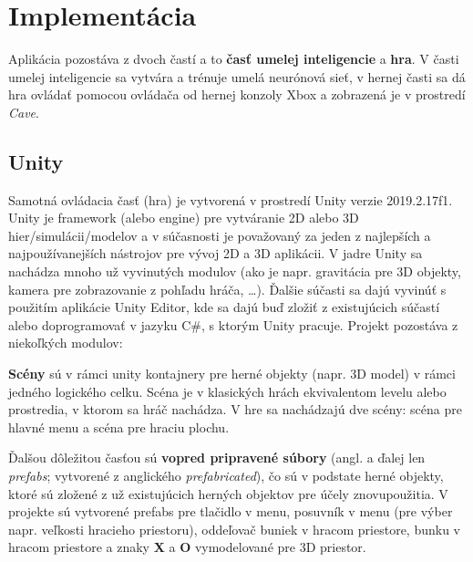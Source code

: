 \clearpage
\section{Implementácia}\label{sec:programming}

Aplikácia pozostáva z dvoch častí a to \textbf{časť umelej inteligencie} a \textbf{hra}.
V časti umelej inteligencie sa vytvára a trénuje umelá neurónová sieť, v hernej časti sa dá hra ovládať pomocou
ovládača od hernej konzoly Xbox a zobrazená je v prostredí \emph{Cave}.

\subsection{Unity}\label{subsec:unity}
Samotná ovládacia časť (hra) je vytvorená v prostredí Unity verzie 2019.2.17f1.
Unity je framework (alebo engine) pre vytváranie 2D alebo 3D hier/simulácii/modelov a v súčasnosti je považovaný za
jeden z najlepších a najpoužívanejších nástrojov pre vývoj 2D a 3D aplikácii.
V jadre Unity sa nachádza mnoho už vyvinutých modulov (ako je napr. gravitácia pre 3D objekty, kamera pre zobrazovanie
z pohľadu hráča, \dots).
Ďalšie súčasti sa dajú vyvinúť s použitím aplikácie Unity Editor, kde sa dajú buď zložiť z existujúcich súčastí
alebo doprogramovať v jazyku C\#, s ktorým Unity pracuje.
Projekt pozostáva z niekoľkých modulov:

\textbf{Scény} sú v rámci unity kontajnery pre herné objekty (napr. 3D model) v rámci jedného logického celku.
Scéna je v klasických hrách ekvivalentom levelu alebo prostredia, v ktorom sa hráč nachádza.
V hre sa nachádzajú dve scény: scéna pre hlavné menu a scéna pre hraciu plochu.

Ďalšou dôležitou časťou sú \textbf{vopred pripravené súbory} (angl. a ďalej len \emph{prefabs}; vytvorené z anglického
\emph{prefabricated}), čo sú v podstate herné objekty, ktoré sú zložené z už existujúcich herných objektov pre účely
znovupoužitia.
V projekte sú vytvorené prefabs pre tlačidlo v menu, posuvník v menu (pre výber napr. veľkosti hracieho priestoru),
oddeľovač buniek v hracom priestore, bunku v hracom priestore a znaky \textbf{X} a \textbf{O} vymodelované pre 3D
priestor.


